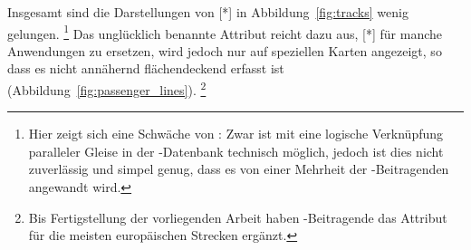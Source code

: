 \documentclass[../main/thesis.tex]{subfiles}
\begin{document}
Insgesamt sind die Darstellungen von [*] in Abbildung~\ref{fig:tracks} wenig gelungen.%
\footnote{Hier zeigt sich eine Schwäche von \osm: Zwar ist mit  eine logische Verknüpfung paralleler Gleise in der \osm-Datenbank technisch möglich, jedoch ist dies nicht zuverlässig und simpel genug, dass es von einer Mehrheit der \osm-Beitragenden angewandt wird.}
Das unglücklich benannte Attribut  reicht dazu aus, [*] für manche Anwendungen zu ersetzen, wird jedoch nur auf speziellen Karten angezeigt,
so dass es nicht annähernd flächendeckend erfasst ist (Abbildung~\ref{fig:passenger_lines}).%
\footnote{Bis Fertigstellung der vorliegenden Arbeit haben \osm-Beitragende das Attribut  für die meisten europäischen Strecken ergänzt.}





\end{document}
